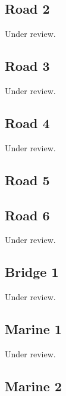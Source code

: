 \documentclass{scrartcl}
\begin{document}
\subsection{Road 2} %
\label{sec:road_2}
Under review.%
\clearpage

\subsection{Road 3} %
\label{sec:road_3}
Under review.%
\clearpage

\subsection{Road 4} %
\label{sec:road_4}
Under review.%
\clearpage

\subsection{Road 5} %
\label{sec:road_5}
\clearpage

\subsection{Road 6} %
\label{sec:road_6}
Under review.%
\clearpage

\subsection{Bridge 1} %
\label{sec:bridge_1}
Under review.%
\clearpage

\subsection{Marine 1} %
\label{sec:marine_1}
Under review.%
\clearpage

\subsection{Marine 2} %
\label{sec:marine_2}
\clearpage

\end{document}
